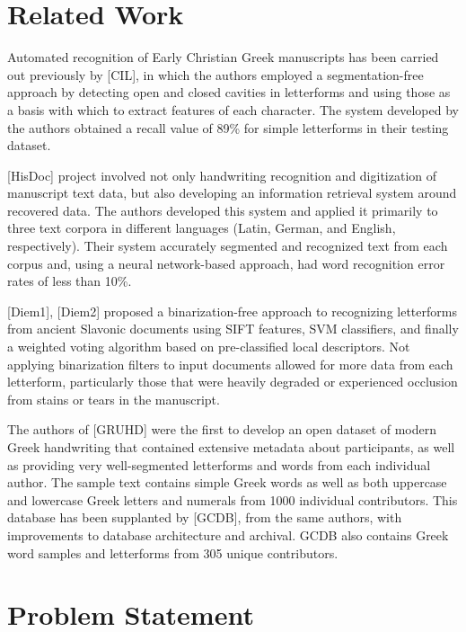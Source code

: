 \documentclass[10pt,twocolumn,letterpaper]{article}
\begin{document}
\section{Related Work}

Automated recognition of Early Christian Greek manuscripts has been carried out previously by [CIL], in which the authors employed a segmentation-free approach by detecting open and closed cavities in letterforms and using those as a basis with which to extract features of each character. The system developed by the authors obtained a recall value of 89\% for simple letterforms in their testing dataset.

[HisDoc] project involved not only handwriting recognition and digitization of manuscript text data, but also developing an information retrieval system around recovered data. The authors developed this system and applied it primarily to three text corpora in different languages (Latin, German, and English, respectively). Their system accurately segmented and recognized text from each corpus and, using a neural network-based approach, had word recognition error rates of less than 10\%.

[Diem1], [Diem2] proposed a binarization-free approach to recognizing letterforms from ancient Slavonic documents using SIFT features, SVM classifiers, and finally a weighted voting algorithm based on pre-classified local descriptors. Not applying binarization filters to input documents allowed for more data from each letterform, particularly those that were heavily degraded or experienced occlusion from stains or tears in the manuscript.

The authors of [GRUHD] were the first to develop an open dataset of modern Greek handwriting that contained extensive metadata about participants, as well as providing very well-segmented letterforms and words from each individual author. The sample text contains simple Greek words as well as both uppercase and lowercase Greek letters and numerals from 1000 individual contributors. This database has been supplanted by [GCDB], from the same authors, with improvements to database architecture and archival. GCDB also contains Greek word samples and letterforms from 305 unique contributors.

\section{Problem Statement}
\end{document}
